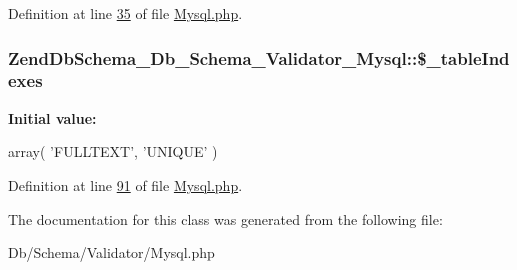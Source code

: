 \-Definition at line \hyperlink{Schema_2Validator_2Mysql_8php_source_l00035}{35} of file \hyperlink{Schema_2Validator_2Mysql_8php_source}{\-Mysql.\-php}.

\hypertarget{classZendDbSchema__Db__Schema__Validator__Mysql_a2f74ecb199b9fc070c6d878586107463}{
\subsubsection[{\$\-\_\-table\-Indexes}]{\setlength{\rightskip}{0pt plus 5cm}\-Zend\-Db\-Schema\-\_\-\-Db\-\_\-\-Schema\-\_\-\-Validator\-\_\-\-Mysql\-::\$\-\_\-table\-Indexes}}\label{classZendDbSchema__Db__Schema__Validator__Mysql_a2f74ecb199b9fc070c6d878586107463}
{\bfseries \-Initial value\-:}
\begin{DoxyCode}
 array(
        \textcolor{stringliteral}{'FULLTEXT'},
        \textcolor{stringliteral}{'UNIQUE'}
    )
\end{DoxyCode}


\-Definition at line \hyperlink{Schema_2Validator_2Mysql_8php_source_l00091}{91} of file \hyperlink{Schema_2Validator_2Mysql_8php_source}{\-Mysql.\-php}.



\-The documentation for this class was generated from the following file\-:\begin{DoxyCompactItemize}
\item 
\-Db/\-Schema/\-Validator/\-Mysql.\-php\end{DoxyCompactItemize}
